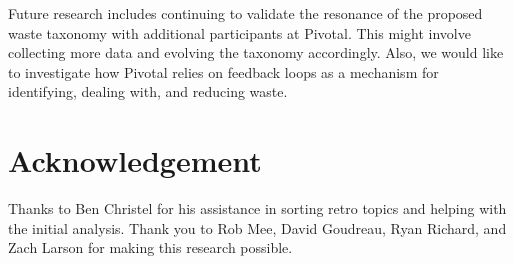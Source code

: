 Future research includes continuing to validate the resonance of the proposed waste taxonomy with additional participants at Pivotal. This might involve collecting more data and evolving the taxonomy accordingly. Also, we would like to investigate how Pivotal relies on feedback loops as a mechanism for identifying, dealing with, and reducing waste. 





\section*{Acknowledgement}
Thanks to Ben Christel for his assistance in sorting retro topics and helping with the initial analysis. Thank you to Rob Mee, David Goudreau, Ryan Richard, and Zach Larson for making this research possible.


